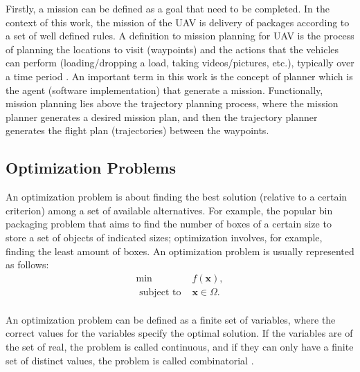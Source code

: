 \documentclass[conference,harvard,brazil,english]{sbatex}
\begin{document}
Firstly, a mission can be defined as a goal that need to be completed. In the context of this work, the mission of the UAV is delivery of packages according to a set of well defined rules. A definition to mission planning for UAV is the process of planning the locations to visit (waypoints) and the actions that the vehicles can perform (loading/dropping a load, taking videos/pictures, etc.), typically over a time period \cite{ramirez2014solving}. An important term in this work is the concept of planner which is the agent (software implementation) that generate a mission. Functionally, mission planning lies above the trajectory planning process, where the mission planner generates a desired mission plan, and then the trajectory planner generates the flight plan (trajectories) between the waypoints.





\subsection{Optimization Problems}

An optimization problem is about finding the best solution (relative to a certain criterion) among a set of available alternatives. For example, the popular bin packaging problem that aims to find the number of boxes of a certain size to store a set of objects of indicated sizes; optimization involves, for example, finding the least amount of boxes. An optimization problem is usually represented as follows:
\begin{equation}
	\label{eq:optproblema}
	\begin{array}{cc}
		\min & f(\textbf{x}),  \\
		\textrm{ subject to } & \textbf{x}\in\Omega.\\
	\end{array}
\end{equation}	
	
An optimization problem can be defined as a finite set of variables, where the correct values for the variables specify the optimal solution. If the variables are of the set of real, the problem is called continuous, and if they can only have a finite set of distinct values, the problem is called combinatorial \protect\cite{francq2011optimization}.
\end{document}
